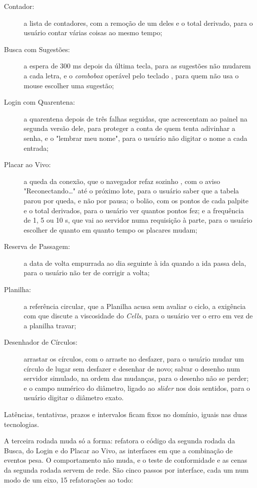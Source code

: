 \begin{description}
\item[{Contador:}] a lista de contadores, com a remoção de um deles e o
total derivado, para o usuário contar várias coisas ao mesmo tempo;
\item[{Busca com Sugestões:}] a espera de 300 ms depois da última tecla,
para as sugestões não mudarem a cada letra, e o \emph{combobox} operável
pelo teclado \cite{w3c2026}, para quem não usa o mouse escolher uma
sugestão;
\item[{Login com Quarentena:}] a quarentena depois de três falhas seguidas,
que \textcite[p. 539]{berry2020} acrescentam ao painel na segunda
versão dele, para proteger a conta de quem tenta adivinhar a senha, e
o "lembrar meu nome", para o usuário não digitar o nome a cada
entrada;
\item[{Placar ao Vivo:}] a queda da conexão, que o navegador refaz sozinho
\cite[§ 9.2.1]{whatwg2026}, com o aviso "Reconectando…" até o
próximo lote, para o usuário saber que a tabela parou por queda, e não
por pausa; o bolão, com os pontos de cada palpite e o total
derivados, para o usuário ver quantos pontos fez; e a frequência de 1,
5 ou 10 s, que vai ao servidor numa requisição à parte, para o usuário
escolher de quanto em quanto tempo os placares mudam;
\item[{Reserva de Passagem:}] a data de volta empurrada ao dia seguinte à
ida quando a ida passa dela, para o usuário não ter de corrigir a
volta;
\item[{Planilha:}] a referência circular, que a Planilha acusa sem avaliar o
ciclo, a exigência com que \textcite[p. 54]{kiss2014} discute a
viscosidade do \emph{Cells}, para o usuário ver o erro em vez de a planilha
travar;
\item[{Desenhador de Círculos:}] arrastar os círculos, com o arraste no
desfazer, para o usuário mudar um círculo de lugar sem desfazer e
desenhar de novo; salvar o desenho num servidor simulado, na ordem
das mudanças, para o desenho não se perder; e o campo numérico do
diâmetro, ligado ao \emph{slider} nos dois sentidos, para o usuário
digitar o diâmetro exato.
\end{description}

Latências, tentativas, prazos e intervalos ficam fixos no domínio,
iguais nas duas tecnologias.

A terceira rodada muda só a forma: refatora o código da segunda rodada
da Busca, do Login e do Placar ao Vivo, as interfaces em que a
combinação de eventos pesa.
O comportamento não muda, e o teste de conformidade e as cenas da
segunda rodada servem de rede.
São cinco passos por interface, cada um num modo de um eixo, 15
refatorações ao todo:

